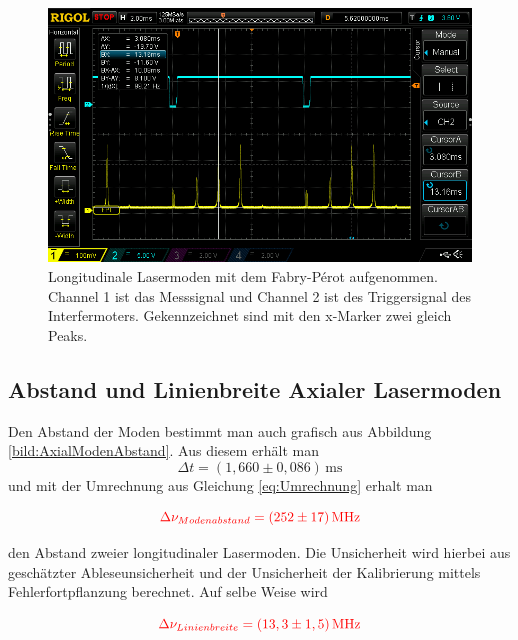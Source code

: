 \begin{figure}[ht]
    \centering
    \includegraphics[width = \linewidth]{Bilder/Auswertung/FabryPerotKalibr.png}
    \caption{Longitudinale Lasermoden mit dem Fabry-Pérot aufgenommen. Channel 1 ist das Messsignal und Channel 2 ist des Triggersignal des Interfermoters. Gekennzeichnet sind 
    mit den x-Marker zwei gleich Peaks.}
    \label{bild:FreierSpektralbereich}
\end{figure}


\subsection*{Abstand und Linienbreite Axialer Lasermoden}

Den Abstand der Moden bestimmt man auch grafisch aus Abbildung \ref{bild:AxialModenAbstand}. Aus diesem erhält man 
\begin{equation*}
    \Delta t = (1,660 \pm 0,086)\,\mathrm{ms}
\end{equation*}
und mit der Umrechnung aus Gleichung \ref{eq:Umrechnung} erhalt man 

\begin{equation}
    \textcolor{red}{\Delta \nu_{Modenabstand} = (252 \pm 17)\,\mathrm{MHz}}
    \label{eq:Modenabstand}
\end{equation}

den Abstand zweier longitudinaler Lasermoden. Die Unsicherheit wird hierbei aus geschätzter Ableseunsicherheit und
der Unsicherheit der Kalibrierung  mittels Fehlerfortpflanzung berechnet. Auf selbe Weise wird 

\begin{equation}
    \textcolor{red}{\Delta \nu_{Linienbreite} = (13,3 \pm 1,5)\,\mathrm{MHz}}
\end{equation}

